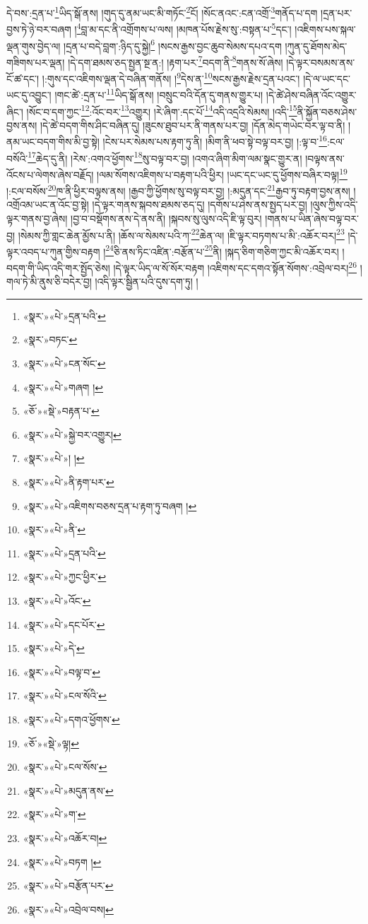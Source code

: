 དེ་བས་:དྲན་པ་\footnote{«སྣར་»«པེ་»དྲན་པའི་}ཡིད་སྒོ་ནས། །གུད་དུ་ནམ་ཡང་མི་གཏོང་\footnote{«སྣར་»བཏང་}ངོ། །སོང་ནའང་:ངན་འགྲོ་\footnote{«སྣར་»«པེ་»ངན་སོང་}གནོད་པ་དག །དྲན་པར་བྱས་ཏེ་ཉེ་བར་བཞག །\footnote{«སྣར་»«པེ་»གཞག །}བླ་མ་དང་ནི་འགྲོགས་པ་ལས། །མཁན་པོས་རྗེས་སུ་:བསྟན་པ་\footnote{«ཅོ་»«སྡེ་»བརྟན་པ་}དང་། །འཇིགས་པས་སྐལ་ལྡན་གུས་བྱེད་ལ། །དྲན་པ་བདེ་བླག་:ཉིད་དུ་སྐྱེ།\footnote{«སྣར་»«པེ་»སྐྱེ་བར་འགྱུར།} །སངས་རྒྱས་བྱང་ཆུབ་སེམས་དཔའ་དག །ཀུན་དུ་ཐོགས་མེད་གཟིགས་པར་ལྡན། །དེ་དག་ཐམས་ཅད་སྤྱན་སྔ་ན:། །རྟག་པར་\footnote{«སྣར་»«པེ་»། །}བདག་ནི་\footnote{«སྣར་»«པེ་»ནི་རྟག་པར་}གནས་སོ་ཞེས། །དེ་ལྟར་བསམས་ནས་ངོ་ཚ་དང་། །:གུས་དང་འཇིགས་ལྡན་དེ་བཞིན་གནོས། །\footnote{«སྣར་»«པེ་»འཇིགས་བཅས་དྲན་པ་རྟག་ཏུ་བཞག །}དེས་ན་\footnote{«སྣར་»«པེ་»ནི་}སངས་རྒྱས་རྗེས་དྲན་པའང་། །དེ་ལ་ཡང་དང་ཡང་དུ་འབྱུང་། །གང་ཚེ་:དྲན་པ་\footnote{«སྣར་»«པེ་»དྲན་པའི་}ཡིད་སྒོ་ནས། །བསྲུང་བའི་དོན་དུ་གནས་གྱུར་པ། །དེ་ཚེ་ཤེས་བཞིན་འོང་འགྱུར་ཞིང་། །སོང་བ་དག་ཀྱང་\footnote{«སྣར་»«པེ་»ཀྱང་ཕྱིར་}:འོང་བར་\footnote{«སྣར་»«པེ་»འོང་}འགྱུར། །རེ་ཞིག་:དང་པོ་\footnote{«སྣར་»«པེ་»དང་པོར་}འདི་འདྲའི་སེམས། །འདི་\footnote{«སྣར་»«པེ་»དེ་}ནི་སྐྱོན་བཅས་ཤེས་བྱས་ནས། །དེ་ཚེ་བདག་གིས་ཤིང་བཞིན་དུ། །ཟུངས་ཐུབ་པར་ནི་གནས་པར་བྱ། །དོན་མེད་གཡེང་བར་ལྟ་བ་ནི། །ནམ་ཡང་བདག་གིས་མི་བྱ་སྟེ། །ངེས་པར་སེམས་པས་རྟག་ཏུ་ནི། །མིག་ནི་ཕབ་སྟེ་བལྟ་བར་བྱ། །:ལྟ་བ་\footnote{«སྣར་»«པེ་»བལྟ་བ་}:ངལ་བསོའི་\footnote{«སྣར་»«པེ་»ངལ་སོའི་}ཆེད་དུ་ནི། །རེས་:འགའ་ཕྱོགས་\footnote{«སྣར་»«པེ་»དགའ་ཕྱོགས་}སུ་བལྟ་བར་བྱ། །འགའ་ཞིག་མིག་ལམ་སྣང་གྱུར་ན། །བལྟས་ནས་འོངས་པ་ལེགས་ཞེས་བརྗོད། །ལམ་སོགས་འཇིགས་པ་བརྟག་པའི་ཕྱིར། །ཡང་དང་ཡང་དུ་ཕྱོགས་བཞིར་བལྟ།\footnote{«ཅོ་»«སྡེ་»ལྟ།} །:ངལ་བསོས་\footnote{«སྣར་»«པེ་»ངལ་སོས་}ཁ་ནི་ཕྱིར་བལྟས་ནས། །རྒྱབ་ཀྱི་ཕྱོགས་སུ་བལྟ་བར་བྱ། །:མདུན་དང་\footnote{«སྣར་»«པེ་»མདུན་ནས་}རྒྱབ་ཏུ་བརྟག་བྱས་ནས། །འགྲོའམ་ཡང་ན་འོང་བྱ་སྟེ། །དེ་ལྟར་གནས་སྐབས་ཐམས་ཅད་དུ། །དགོས་པ་ཤེས་ནས་སྤྱད་པར་བྱ། །ལུས་ཀྱིས་འདི་ལྟར་གནས་བྱ་ཞེས། །བྱ་བ་བསྡོགས་ནས་དེ་ནས་ནི། །སྐབས་སུ་ལུས་འདི་ཇི་ལྟ་བུར། །གནས་པ་ཡིན་ཞེས་བལྟ་བར་བྱ། །སེམས་ཀྱི་གླང་ཆེན་མྱོས་པ་ནི། །ཆོས་ལ་སེམས་པའི་ཀ་\footnote{«སྣར་»«པེ་»ག་}ཆེན་ལ། །ཇི་ལྟར་བཏགས་པ་མི་:འཆོར་བར།\footnote{«སྣར་»«པེ་»འཆོར་བ།} །དེ་ལྟར་འབད་པ་ཀུན་གྱིས་བརྟག །\footnote{«སྣར་»«པེ་»བཏག །}ཅི་ནས་ཏིང་འཛིན་:བརྩོན་པ་\footnote{«སྣར་»«པེ་»བརྩོན་པར་}ནི། །སྐད་ཅིག་གཅིག་ཀྱང་མི་འཆོར་བར། །བདག་གི་ཡིད་འདི་གར་སྤྱོད་ཅེས། །དེ་ལྟར་ཡིད་ལ་སོ་སོར་བརྟག །འཇིགས་དང་དགའ་སྟོན་སོགས་:འབྲེལ་བར།\footnote{«སྣར་»«པེ་»འབྲེལ་བས།} །གལ་ཏེ་མི་ནུས་ཅི་བདེར་བྱ། །འདི་ལྟར་སྦྱིན་པའི་དུས་དག་ཏུ། །
